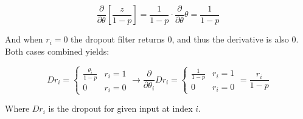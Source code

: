 \documentclass[a4paper]{article}
\begin{document}
\begin{equation*}
    \frac{\partial}{\partial\theta}\left[\frac{z}{1-p}\right] = \frac{1}{1-p} \cdot \frac{\partial}{\partial\theta}\theta = \frac{1}{1-p}
\end{equation*}

And when $r_i = 0$ the dropout filter returns $0$, and thus the derivative is also $0$. Both cases combined yields:

\begin{equation*}
    Dr_i = \begin{cases}
        \frac{\theta_i}{1-p} & r_i = 1 \\
        0 & r_i = 0
    \end{cases} \rightarrow \frac{\partial}{\partial\theta_i}Dr_i = \begin{cases}
        \frac{1}{1-p} & r_i = 1 \\
        0 & r_i = 0
    \end{cases} = \frac{r_i}{1-p}
\end{equation*}

Where $Dr_i$ is the dropout for given input at index $i$.
\end{document}
